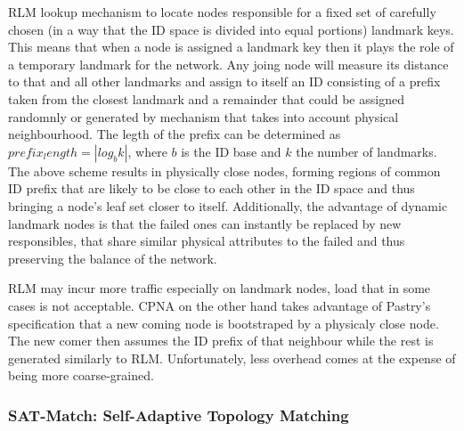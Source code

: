 RLM lookup mechanism to locate nodes responsible for a fixed set of carefully
chosen (in a way that the ID space is divided into equal portions) landmark
keys. This means that when a node is assigned a landmark key then it plays the
role of a temporary landmark for the network. Any joing node will measure its
distance to that and all other landmarks and assign to itself an ID consisting
of a prefix taken from the closest landmark and a remainder that could be
assigned randomnly or generated by mechanism that takes into account physical
neighbourhood. The legth of the prefix can be determined as
$prefix_length=|log_b k|$, where $b$ is the ID base and $k$ the number of
landmarks. The above scheme results in physically close nodes, forming regions
of common ID prefix that are likely to be close to each other in the ID space
and thus bringing a node's leaf set closer to itself. Additionally, the
advantage of dynamic landmark nodes is that the failed ones can instantly be
replaced by new responsibles, that share similar physical attributes to the
failed and thus preserving the balance of the network.

RLM may incur more traffic especially on landmark nodes, load that in some cases
is not acceptable. CPNA on the other hand takes advantage of Pastry's
specification that a new coming node is bootstraped by a physicaly close node.
The new comer then assumes the ID prefix of that neighbour while the rest is
generated similarly to RLM. Unfortunately, less overhead comes at the expense
of being more coarse-grained.

%
%
%

\subsubsection{SAT-Match: Self-Adaptive Topology Matching}

